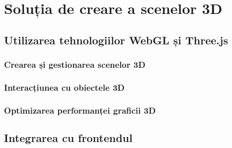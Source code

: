 \section{Soluția de creare a scenelor 3D}
\label{sec:proj-3d}
\subsection{Utilizarea tehnologiilor WebGL și Three.js}
\subsubsection{Crearea și gestionarea scenelor 3D}
\subsubsection{Interacțiunea cu obiectele 3D}
\subsubsection{Optimizarea performanței graficii 3D}
\subsection{Integrarea cu frontendul}







